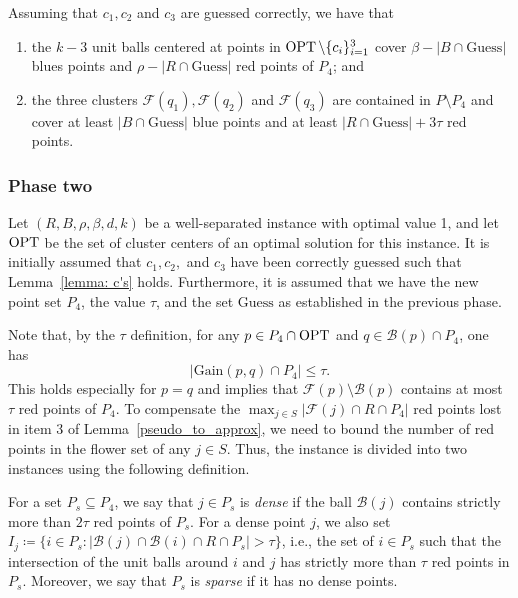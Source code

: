 \begin{lemma}
    \label{lemma: c's}
    Assuming that $c_1,c_2$ and $c_3$ are guessed correctly, we have that
    \begin{enumerate}
        \item the $k-3$ unit balls centered at points in $\operatorname{OPT}\setminus\{c_i\}_{i=1}^3$ cover ${\beta - |B \cap \mathrm{Guess}|}$ blues points and ${\rho - |R \cap \mathrm{Guess}|}$ red points of $P_4$; and
        \item the three clusters $\mathcal{F}(q_1), \mathcal{F}(q_2)$ and $\mathcal{F}(q_3)$ are contained in $P \setminus P_4$ and cover at least  $|B \cap \mathrm{Guess}|$ blue points and at least $|R \cap \mathrm{Guess}| + 3 \tau$ red points.
    \end{enumerate}
\end{lemma}

\subsubsection{Phase two}
Let $(R, B, \rho, \beta, d, k)$ be a well-separated instance with optimal value 1, and let $\operatorname{OPT}$ be the set of cluster centers of an optimal solution for this instance.  
It is initially assumed that $c_1, c_2,$ and $c_3$ have been correctly guessed such that Lemma~\ref{lemma: c's} holds. 
Furthermore, it is assumed that we have the new point set $P_4$, the value $\tau$, and the set $\mathrm{Guess}$ as established in the previous phase.

Note that, by the $\tau$ definition, for any $p \in P_4 \cap \operatorname{OPT}$ and $q \in \mathcal{B}(p) \cap P_4$, one has 
\begin{equation}
    \label{eq:tau}
|\mathrm{Gain}(p,q) \cap P_4| \leq \tau.
\end{equation}
This holds especially for $p=q$ and implies that $\mathcal{F}(p)\setminus\mathcal{B}(p)$ contains at most $\tau$ red points of $P_4$. To compensate the $\max_{j \in S} |\mathcal{F}(j) \cap R \cap P_4|$ red points lost in item 3 of Lemma~\ref{pseudo_to_approx}, we need to bound the number of red points in the flower set of any $j \in S$. Thus, the instance is divided into two instances using the following definition.

\begin{definition}
    For a set $P_s \subseteq P_4$, we say that $j \in P_s$ is \emph{dense} if the ball $\mathcal{B}(j)$ contains strictly more than $2\tau$ red points of $P_s$. For a dense point $j$, we also set ${I_j \coloneqq \{ i \in P_s : |\mathcal{B}(j) \cap \mathcal{B}(i) \cap R \cap P_s| > \tau \}}$, i.e., the set of $i \in P_s$ such that the intersection of the unit balls around $i$ and $j$ has strictly more than $\tau$ red points in $P_s$. Moreover, we say that $P_s$ is \emph{sparse} if it has no dense points.
\end{definition}

